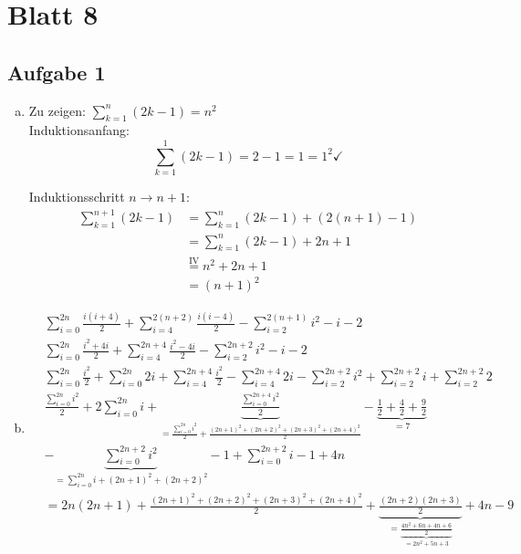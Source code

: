 \section*{Blatt 8}
%

\subsection*{Aufgabe 1}
\begin{enumerate}[a)]
\item Zu zeigen: $  \sum_{k=1}^n (2k-1) = n^2 $\\[1em]
Induktionsanfang: \[ \sum_{k=1}^1 (2k-1) = 2-1 = 1 = 1^2 \checkmark \]


Induktionsschritt $n \to n+1$:
\begin{align*}
\sum_{k=1}^{n+1} (2k-1) &= \sum_{k=1}^n (2k-1) + (2(n+1) -1) \\
                        &= \sum_{k=1}^n (2k-1) + 2 n +1 \\
                        &\stackrel{\text{IV}}{=} n^2 + 2n + 1\\
                        &= (n+1)^2
\end{align*}


\item
%


\begin{align*}
  & \sum_{i=0}^{2n} \frac{i(i+4)}{2}
    + \sum_{i=4}^{2(n+2)} \frac{i(i-4)}{2}
    - \sum_{i=2}^{2(n+1)} i^2 - i - 2 \\
  & \sum_{i=0}^{2n} \frac{i^2+4i}{2}
    + \sum_{i=4}^{2n +4} \frac{i^2 - 4i}{2}
    - \sum_{i=2}^{2n+2} i^2 - i - 2 \\
  & \sum_{i=0}^{2n} \frac{i^2}{2} + \sum_{i=0}^{2n} 2i
    + \sum_{i=4}^{2n +4} \frac{i^2}{2} - \sum_{i=4}^{2n +4} 2i
    - \sum_{i=2}^{2n+2} i^2 + \sum_{i=2}^{2n+2} i + \sum_{i=2}^{2n+2} 2 \\
  & \frac{\sum_{i=0}^{2n}i^2}{2} + 2\sum_{i=0}^{2n} i
   + \underbrace{\frac{\sum_{i=0}^{2n+4} i^2}{2}}_{= \frac{ \sum_{i=0}^{2n} i^2 }{2}
   + \frac{(2n+1)^2 + (2n+2)^2 + (2n+3)^2
   + (2n+4)^2 }{2} } -
    \underbrace{  \frac{1}{2} + \frac{4}{2} + \frac{9}{2}  }_{=7} \\
   & - \underbrace{\sum_{i=0}^{2n+2} i^2}_{= \sum_{i=0}^{2n} i + (2n+1)^2 + (2n+2)^2 }  - 1 + \sum_{i=0}^{2n+2}i - 1 + 4n \\
   & = 2n(2n+1) + \frac{(2n+1)^2 + (2n+2)^2 + (2n+3)^2 + (2n+4)^2}{2} + \underbrace{\frac{(2n+2)(2n+3)}{2}}_{ = \underbrace{\frac{4n^2 + 6n + 4n + 6}{2}}_{=2n^2 + 5n + 3} } + 4n - 9
\end{align*}

\end{enumerate}

